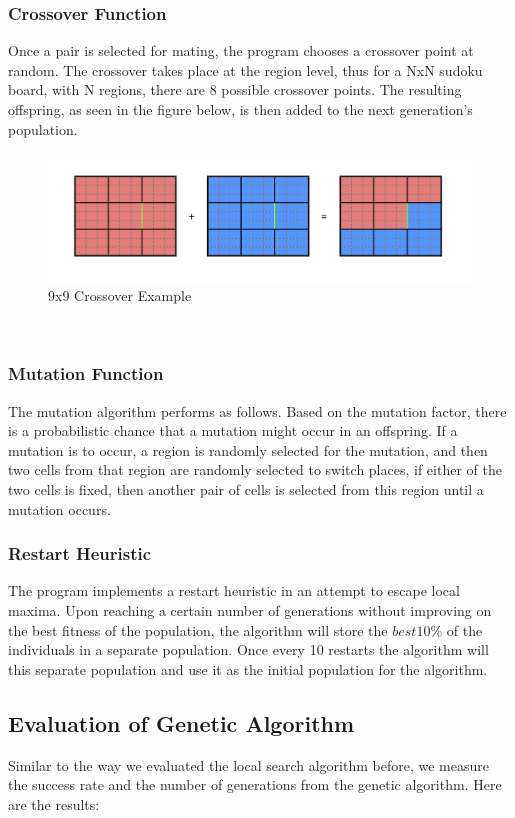 \documentclass[12pt, a4paper]{article}
\begin{document}
			\subsubsection{Crossover Function}
			Once a pair is selected for mating, the program chooses a crossover point at random. The crossover takes place at the region level, thus for a NxN sudoku board, with N regions, there are 8 possible crossover points. The resulting offspring, as seen in the figure below, is then added to the next generation's population.
			\begin{figure}[h]
				\begin{center} 
					\includegraphics[width=6in]{Crossover.png}
					\caption{9x9 Crossover Example} 
					\label{fig:crossover}
				\end{center} 
			\end{figure}\\
			\subsubsection{Mutation Function}
			The mutation algorithm performs as follows. Based on the mutation factor, there is a probabilistic chance that a mutation might occur in an offspring. If a mutation is to occur, a region is randomly selected for the mutation, and then two cells from that region are randomly selected to switch places, if either of the two cells is fixed, then another pair of cells is selected from this region until a mutation occurs.
			\subsubsection{Restart Heuristic}
			The program implements a restart heuristic in an attempt to escape local maxima. Upon reaching a certain number of generations without improving on the best fitness of the population, the algorithm will store the $best 10\%$ of the individuals in a separate population. Once every 10 restarts the algorithm will this separate population and use it as the initial population for the algorithm.	
			\subsection{Evaluation of Genetic Algorithm}
			Similar to the way we evaluated the local search algorithm before, we measure the success rate and the number of generations from the genetic algorithm. Here are the results:
\end{document}
